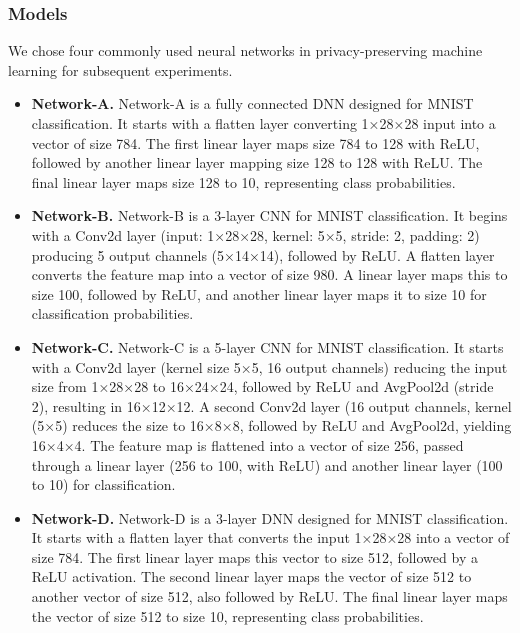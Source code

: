 \documentclass[conference]{IEEEtran}
\begin{document}
\subsubsection{Models}
We chose four commonly used neural networks in privacy-preserving machine learning \cite{liu2024pencilprivateextensiblecollaborative} for subsequent experiments.


\begin{itemize}
    \item \textbf{Network-A.}
    Network-A is a fully connected DNN designed for MNIST classification. It starts with a flatten layer converting 1×28×28 input into a vector of size 784. The first linear layer maps size 784 to 128 with ReLU, followed by another linear layer mapping size 128 to 128 with ReLU. The final linear layer maps size 128 to 10, representing class probabilities.
    \item \textbf{Network-B.}
    Network-B is a 3-layer CNN for MNIST classification. It begins with a Conv2d layer (input: 1×28×28, kernel: 5×5, stride: 2, padding: 2) producing 5 output channels (5×14×14), followed by ReLU. A flatten layer converts the feature map into a vector of size 980. A linear layer maps this to size 100, followed by ReLU, and another linear layer maps it to size 10 for classification probabilities.
    \item \textbf{Network-C.}
    Network-C is a 5-layer CNN for MNIST classification. It starts with a Conv2d layer (kernel size 5×5, 16 output channels) reducing the input size from 1×28×28 to 16×24×24, followed by ReLU and AvgPool2d (stride 2), resulting in 16×12×12. A second Conv2d layer (16 output channels, kernel (5×5) reduces the size to 16×8×8, followed by ReLU and AvgPool2d, yielding 16×4×4. The feature map is flattened into a vector of size 256, passed through a linear layer (256 to 100, with ReLU) and another linear layer (100 to 10) for classification.
    \item \textbf{Network-D.}
    Network-D is a 3-layer DNN designed for MNIST classification. It starts with a flatten layer that converts the input 1×28×28 into a vector of size 784. The first linear layer maps this vector to size 512, followed by a ReLU activation. The second linear layer maps the vector of size 512 to another vector of size 512, also followed by ReLU. The final linear layer maps the vector of size 512 to size 10, representing class probabilities.
    
\end{itemize}
\end{document}
